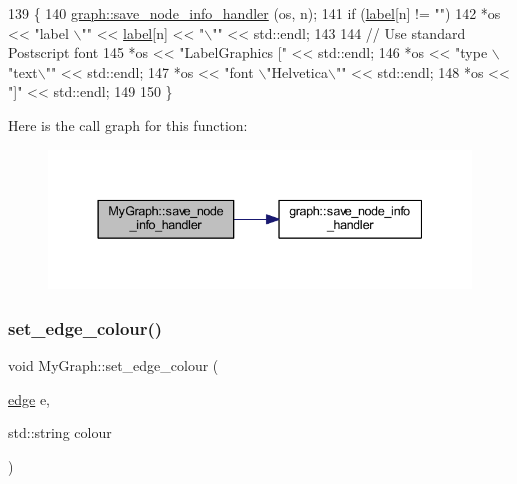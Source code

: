\begin{DoxyCode}
139 \{
140     \mbox{\hyperlink{classgraph_a994f87e1b7f1f723cf03e54e2eb7a99d}{graph::save\_node\_info\_handler}} (os, n);
141     \textcolor{keywordflow}{if} (\mbox{\hyperlink{class_my_graph_a5c9923e2b43cb5a3139715acc34b8ca8}{label}}[n] != \textcolor{stringliteral}{""})    
142         *os << \textcolor{stringliteral}{"label \(\backslash\)""} << \mbox{\hyperlink{class_my_graph_a5c9923e2b43cb5a3139715acc34b8ca8}{label}}[n] << \textcolor{stringliteral}{"\(\backslash\)""} << std::endl;
143 
144     \textcolor{comment}{// Use standard Postscript font}
145     *os << \textcolor{stringliteral}{"LabelGraphics ["} << std::endl;
146     *os << \textcolor{stringliteral}{"type \(\backslash\)"text\(\backslash\)""} << std::endl;
147     *os << \textcolor{stringliteral}{"font \(\backslash\)"Helvetica\(\backslash\)""} << std::endl;
148     *os << \textcolor{stringliteral}{"]"} << std::endl;
149 
150 \}
\end{DoxyCode}
Here is the call graph for this function\+:
\nopagebreak
\begin{figure}[H]
\begin{center}
\leavevmode
\includegraphics[width=337pt]{class_my_graph_ad5f4b3ce70135723fe08a301d20c4a8a_cgraph}
\end{center}
\end{figure}
\mbox{\label{class_my_graph_a865b0e9fd7f74cd40f23230733746a93}} 
\subsubsection{\texorpdfstring{set\+\_\+edge\+\_\+colour()}{set\_edge\_colour()}}
{\footnotesize\ttfamily void My\+Graph\+::set\+\_\+edge\+\_\+colour (\begin{DoxyParamCaption}\item[{\mbox{\hyperlink{classedge}{edge}}}]{e,  }\item[{std\+::string}]{colour }\end{DoxyParamCaption})\hspace{0.3cm}{\ttfamily [inline]}}



